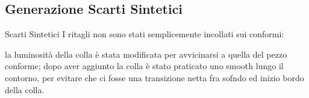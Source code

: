 \subsection {Generazione Scarti Sintetici}


Scarti Sintetici
 I ritagli non sono stati semplicemente incollati sui conformi:

 la luminosità della colla è stata modificata per avvicinarsi a quella del pezzo conforme;
 dopo aver aggiunto la colla è stato praticato uno smooth lungo il contorno, per evitare che ci fosse una transizione netta fra sofndo ed inizio bordo della colla.







































